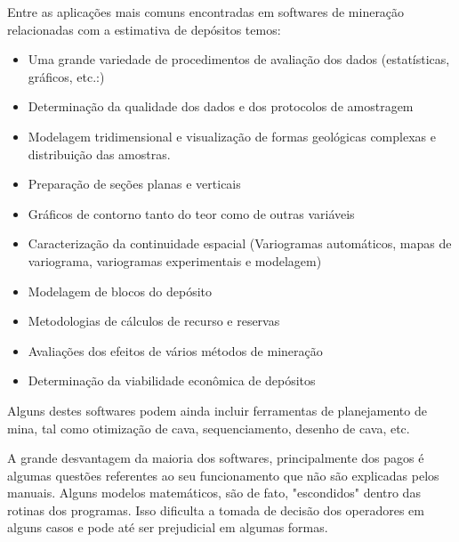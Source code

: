 Entre as aplicações mais comuns encontradas em softwares de mineração relacionadas com a estimativa de depósitos temos:

\begin{itemize}
\item Uma grande variedade de procedimentos de avaliação dos dados (estatísticas, gráficos, etc.:)
\item Determinação da qualidade dos dados e dos protocolos de amostragem
\item Modelagem tridimensional e visualização de formas geológicas complexas e distribuição das amostras.
\item Preparação de seções planas e verticais 
\item Gráficos de contorno tanto do teor como de outras variáveis 
\item Caracterização da continuidade espacial (Variogramas automáticos, mapas de variograma, variogramas experimentais e modelagem)
\item Modelagem de blocos do depósito
\item Metodologias de cálculos de recurso e reservas
\item Avaliações dos efeitos de vários métodos de mineração
\item Determinação da viabilidade econômica de depósitos
\end{itemize}

Alguns destes softwares podem ainda incluir ferramentas de planejamento de mina, tal como otimização de cava, sequenciamento, desenho de cava, etc. 

A grande desvantagem da maioria dos softwares, principalmente dos pagos é algumas questões referentes ao seu funcionamento que não são explicadas pelos manuais. Alguns modelos matemáticos, são de fato, "escondidos" dentro das rotinas dos programas. Isso dificulta a tomada de decisão dos operadores em alguns casos e pode até ser prejudicial em algumas formas. 


